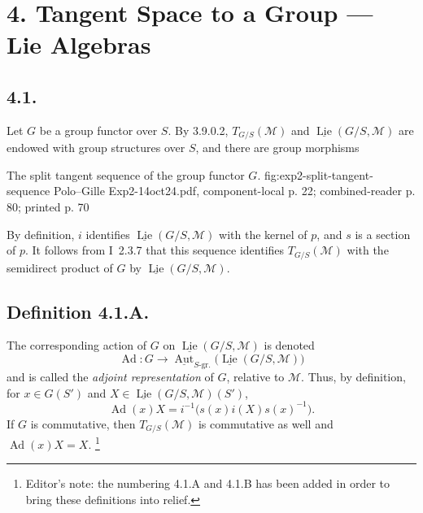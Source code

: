 
\setcounter{footnote}{48}

\section*{4. Tangent Space to a Group --- Lie Algebras}

\subsection*{4.1.}
Let \(G\) be a group functor over \(S\). By 3.9.0.2,
\(T_{G/S}(\mathcal M)\) and
\(\underline{\operatorname{Lie}}(G/S,\mathcal M)\) are endowed with
group structures over \(S\), and there are group morphisms

  {The split tangent sequence of the group functor \(G\).}
  {fig:exp2-split-tangent-sequence}
  {Polo--Gille Exp2-14oct24.pdf, component-local p. 22; combined-reader p. 80; printed p. 70}

By definition, \(i\) identifies
\(\underline{\operatorname{Lie}}(G/S,\mathcal M)\) with the kernel of
\(p\), and \(s\) is a section of \(p\). It follows from I~2.3.7 that this
sequence identifies \(T_{G/S}(\mathcal M)\) with the semidirect product
of \(G\) by \(\underline{\operatorname{Lie}}(G/S,\mathcal M)\).

\subsection*{Definition 4.1.A.}
The corresponding action of \(G\) on
\(\underline{\operatorname{Lie}}(G/S,\mathcal M)\) is denoted
\[
  \operatorname{Ad}:G\longrightarrow
  \underline{\operatorname{Aut}}_{S\text{-gr.}}
    \bigl(\underline{\operatorname{Lie}}(G/S,\mathcal M)\bigr)
\]
and is called the \emph{adjoint representation} of \(G\), relative to
\(\mathcal M\). Thus, by definition, for \(x\in G(S')\) and
\(X\in\underline{\operatorname{Lie}}(G/S,\mathcal M)(S')\),
\[
  \operatorname{Ad}(x)X
  =i^{-1}\bigl(s(x)i(X)s(x)^{-1}\bigr).
\]
If \(G\) is commutative, then \(T_{G/S}(\mathcal M)\) is commutative as
well and \(\operatorname{Ad}(x)X=X\).
\footnote{Editor's note: the numbering 4.1.A and 4.1.B has been added in
order to bring these definitions into relief.}

